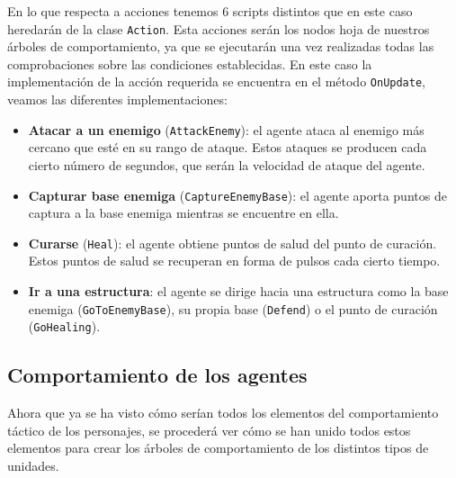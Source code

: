 En lo que respecta a acciones tenemos 6 scripts distintos que en este caso heredarán de la clase \texttt{Action}. Esta acciones serán los nodos hoja de nuestros árboles de comportamiento, ya que se ejecutarán una vez realizadas todas las comprobaciones sobre las condiciones establecidas. En este caso la implementación de la acción requerida se encuentra en el método \texttt{OnUpdate}, veamos las diferentes implementaciones:

\begin{itemize}
    \item \textbf{Atacar a un enemigo} (\texttt{AttackEnemy}): el agente ataca al enemigo más cercano que esté en su rango de ataque. Estos ataques se producen cada cierto número de segundos, que serán la velocidad de ataque del agente.
    
        
    
    \item \textbf{Capturar base enemiga} (\texttt{CaptureEnemyBase}): el agente aporta puntos de captura a la base enemiga mientras se encuentre en ella.
        
        
        
    \item \textbf{Curarse} (\texttt{Heal}): el agente obtiene puntos de salud del punto de curación. Estos puntos de salud se recuperan en forma de pulsos cada cierto tiempo.
        
        
        
    \item \textbf{Ir a una estructura}: el agente se dirige hacia una estructura como la base enemiga (\texttt{GoToEnemyBase}), su propia base (\texttt{Defend}) o el punto de curación (\texttt{GoHealing}).
    
        
\end{itemize}


\subsection{Comportamiento de los agentes}

Ahora que ya se ha visto cómo serían todos los elementos del comportamiento táctico de los personajes, se procederá ver cómo se han unido todos estos elementos para crear los árboles de comportamiento de los distintos tipos de unidades.


